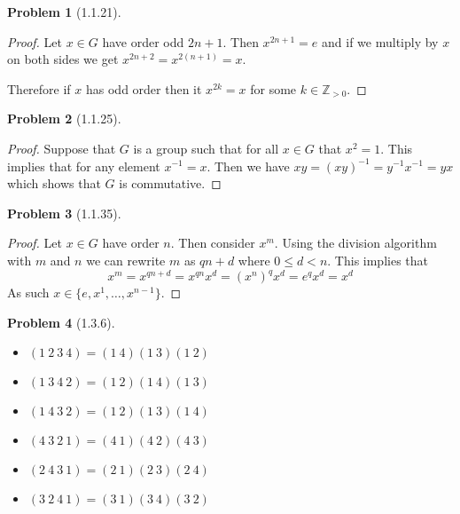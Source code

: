 \documentclass[10pt]{article}
\newcommand{\sk}{\vskip 10mm}
\newcommand{\bb}[1]{\mathbb{#1}}
\theoremstyle{plain}
\newtheorem{problem}{Problem}
\theoremstyle{remark}
\begin{document}
\begin{problem}[1.1.21] 
  
\end{problem}

\begin{proof}
  Let $x\in G$ have order odd $2n+1$. Then $x^{2n+1}=e$ and if we multiply by $x$
  on both sides we get $x^{2n+2}=x^{2(n+1)}=x$.

  Therefore if $x$ has odd order then it $x^{2k}=x$ for some $k\in\bb{Z}_{>0}$.
\end{proof}

\sk

\begin{problem}[1.1.25] 
  
\end{problem}

\begin{proof}
  Suppose that $G$ is a group such that for all $x\in G$ that $x^2=1$.
  This implies that for any element $x^{-1}=x$. Then we have
  $xy=(xy)^{-1}=y^{-1}x^{-1}=yx$
  which shows that $G$ is commutative.
\end{proof}

\sk

\begin{problem}[1.1.35] 
  
\end{problem}

\begin{proof}
  Let $x\in G$ have order $n$. Then consider $x^m$. Using the division algorithm
  with $m$ and $n$ we can rewrite $m$ as $qn+d$ where $0\leq d<n$. This implies
  that
  \[ x^m=x^{qn+d}=x^{qn}x^d=(x^n)^qx^d=e^qx^d=x^d \]
  As such $x\in\{e,x^1,\ldots,x^{n-1}\}$.
\end{proof}

\sk

\begin{problem}[1.3.6] 
  
\end{problem}

\begin{itemize}
\item $(1\ 2\ 3\ 4)=(1\ 4)(1\ 3)(1\ 2)$
\item $(1\ 3\ 4\ 2)=(1\ 2)(1\ 4)(1\ 3)$
\item $(1\ 4\ 3\ 2)=(1\ 2)(1\ 3)(1\ 4)$
\item $(4\ 3\ 2\ 1)=(4\ 1)(4\ 2)(4\ 3)$
\item $(2\ 4\ 3\ 1)=(2\ 1)(2\ 3)(2\ 4)$
\item $(3\ 2\ 4\ 1)=(3\ 1)(3\ 4)(3\ 2)$
\end{itemize}
\end{document}

